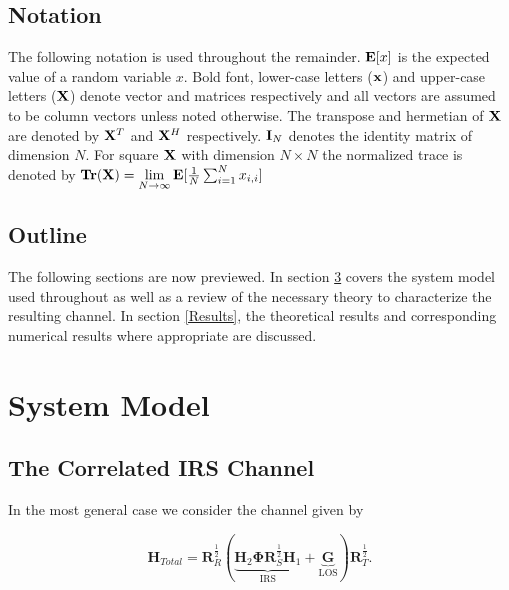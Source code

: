 \documentclass[12pt,a4paper]{report}
\begin{document}
\section{Notation}
The following notation is used throughout the remainder. 
$\mathop{\bf E{}}[x]$ is the expected value of a random variable $x$.
Bold font, lower-case letters ($\mathbf{x}$) and upper-case letters ($\mathbf{X}$) denote vector and matrices respectively and all vectors are assumed to be column vectors unless noted otherwise. 
The transpose and hermetian of $\mathbf{X}$ are denoted by $\mathbf{X}^T$ and $\mathbf{X}^H$ respectively.
$\mathbf{I}_N$ denotes the identity matrix of dimension $N$.
For square $\mathbf{X}$ with dimension $N\times N$ the normalized trace is denoted by $\mathop{\bf Tr}(\mathbf{X})  = \underset{N \rightarrow \infty}{\text{lim}}
\mathop{\bf E{}}[\frac{1}{N}\sum_{i=1}^N x_{i,i}]$

\section{Outline}
The following sections are now previewed. In section \ref{system_model} covers the system model used throughout as well as a review of the necessary theory to characterize the resulting channel. In section \ref{Results}, the theoretical results and corresponding numerical results where appropriate are discussed. 

\chapter{System Model}\label{system_model}
\section{The Correlated IRS Channel}
In the most general case we consider the channel given by 

	\begin{equation}
	\mathbf{H}_{Total} = \mathbf{R}_{R}^{\frac{1}{2}}(\underbrace{\mathbf{H}_{2}\boldsymbol{\Phi}\mathbf{R}_{S}^{\frac{1}{2}}\mathbf{H}_{1}}_{\text{IRS}} + \underbrace{\mathbf{G}}_{\text{LOS}})\mathbf{R}_{T}^{\frac{1}{2}}.
	\end{equation}
\end{document}
